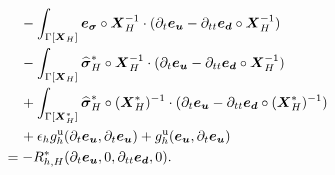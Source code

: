 \documentclass[11pt,reqno]{amsart}
\theoremstyle{definition}
\theoremstyle{plain}
\numberwithin{theorem}{section}
\numberwithin{proposition}{section}
\numberwithin{lemma}{section}
\numberwithin{equation}{section}
\newcommand{\bs}[1]{\boldsymbol{#1}}
\newcommand{\dep}{{{\bs{d}}}}
\renewcommand{\(}{\bigl(}
\renewcommand{\)}{\bigr)}
\begin{document}
\begin{subequations}
\begin{align}
&\quad\, - \int_{\Gamma[\bs X_H]} {\bs e}_{{\bs \sigma} } \circ{\bs X}_H^{-1} \cdot ( \partial_t {\bs e}_{\bs u} - \partial_{tt}{\bs e}_\dep \circ{\bs X}_H^{-1} ) \label{err-j-dte}\\ 
&\quad\, - \int_{\Gamma[\bs X_H]} {\widehat{\bs \sigma} }_H^*\circ{\bs X}_H^{-1} \cdot (\partial_t {\bs e}_{\bs u} - \partial_{tt}{\bs e}_\dep \circ{\bs X}_H^{-1}  ) 
\label{err-k-dte}\\ 
&\quad\, + \int_{\Gamma[\bs X_H^*]} {\widehat{\bs \sigma} }_H^* \circ({\bs X}_H^*)^{-1} \cdot ( \partial_t {\bs e}_{\bs u} - \partial_{tt}{\bs e}_\dep \circ({\bs X}_H^*)^{-1}) 
\label{err-l-dte}\\ 
&\quad\, + \epsilon_h g_h^{\rm u} (\partial_t{\bs e}_{\bs u}, \partial_t{\bs e}_{\bs u})   + g_h^{\rm u} ({\bs e}_{\bs u}, \partial_t{\bs e}_{\bs u})  \label{err-m-dte} \\
& = -R_{h,H}^*(\partial_t {\bs e}_{\bs u}, 0, \partial_{tt}{\bs e}_\dep, 0) . \label{err-n-dte} 
\end{align}
\end{subequations}
\end{document}
